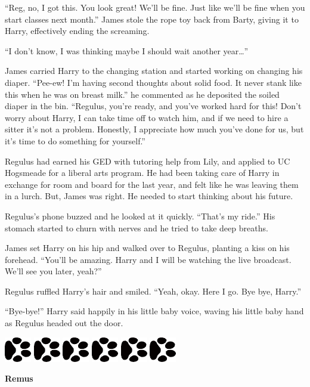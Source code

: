 \documentclass[12pt,twoside,openright]{memoir}
\newcommand{\dogPrintRule}{	
	\begin{center}
		\hspace{.5em}
		\includegraphics[angle=60]{dogprint.pdf}
		\hspace{.5em}
		\includegraphics[angle=120]{dogprint.pdf}
		\hspace{.5em}
		\includegraphics[angle=60]{dogprint.pdf}
		\hspace{.5em}
		\includegraphics[angle=120]{dogprint.pdf}
		\hspace{.5em}
		\includegraphics[angle=60]{dogprint.pdf}
		\hspace{.5em}
		\includegraphics[angle=120]{dogprint.pdf}
		\hspace{.5em}
	\end{center}
}
\begin{document}
``Reg, no, I got this. You look great! We'll be fine. Just like we'll be fine when you start classes next month.'' James stole the rope toy back from Barty, giving it to Harry, effectively ending the screaming. 

``I don't know, I was thinking maybe I should wait another year…''

James carried Harry to the changing station and started working on changing his diaper. ``Pee-ew! I'm having second thoughts about solid food. It never stank like this when he was on breast milk.'' he commented as he deposited the soiled diaper in the bin. ``Regulus, you're ready, and you've worked hard for this! Don't worry about Harry, I can take time off to watch him, and if we need to hire a sitter it's not a problem. Honestly, I appreciate how much you've done for us, but it's time to do something for yourself.''

Regulus had earned his GED with tutoring help from Lily, and applied to UC Hogsmeade for a liberal arts program. He had been taking care of Harry in exchange for room and board for the last year, and felt like he was leaving them in a lurch. But, James was right. He needed to start thinking about his future. 

Regulus's phone buzzed and he looked at it quickly. ``That's my ride.'' His stomach started to churn with nerves and he tried to take deep breaths. 

James set Harry on his hip and walked over to Regulus, planting a kiss on his forehead. ``You'll be amazing. Harry and I will be watching the live broadcast. We'll see you later, yeah?''

Regulus ruffled Harry's hair and smiled. ``Yeah, okay. Here I go. Bye bye, Harry.''

``Bye-bye!'' Harry said happily in his little baby voice, waving his little baby hand as Regulus headed out the door.

\dogPrintRule

\textbf{Remus} 
\end{document}
